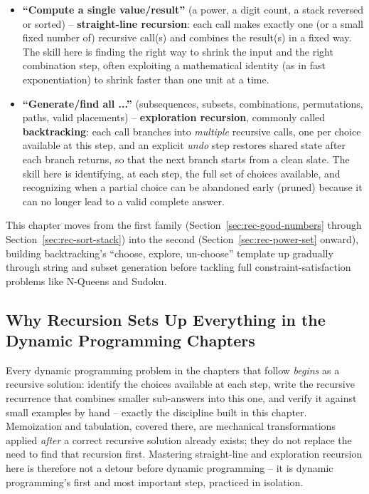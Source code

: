 \begin{patternbox}
\begin{itemize}
  \item \textbf{``Compute a single value/result''} (a power, a digit
        count, a stack reversed or sorted) -- \textbf{straight-line
        recursion}: each call makes exactly one (or a small fixed
        number of) recursive call(s) and combines the result(s) in a
        fixed way. The skill here is finding the right way to shrink the
        input and the right combination step, often exploiting a
        mathematical identity (as in fast exponentiation) to shrink
        faster than one unit at a time.
  \item \textbf{``Generate/find all ...''} (subsequences, subsets,
        combinations, permutations, paths, valid placements) --
        \textbf{exploration recursion}, commonly called
        \textbf{backtracking}: each call branches into \emph{multiple}
        recursive calls, one per choice available at this step, and an
        explicit \emph{undo} step restores shared state after each
        branch returns, so that the next branch starts from a clean
        slate. The skill here is identifying, at each step, the full set
        of choices available, and recognizing when a partial choice can
        be abandoned early (pruned) because it can no longer lead to a
        valid complete answer.
\end{itemize}
This chapter moves from the first family (Section~\ref{sec:rec-good-numbers}
through Section~\ref{sec:rec-sort-stack}) into the second
(Section~\ref{sec:rec-power-set} onward), building backtracking's
``choose, explore, un-choose'' template up gradually through string and
subset generation before tackling full constraint-satisfaction problems
like N-Queens and Sudoku.
\end{patternbox}

\subsection*{Why Recursion Sets Up Everything in the Dynamic Programming Chapters}

Every dynamic programming problem in the chapters that follow
\emph{begins} as a recursive solution: identify the choices available at
each step, write the recursive recurrence that combines smaller
sub-answers into this one, and verify it against small examples by hand
-- exactly the discipline built in this chapter. Memoization and
tabulation, covered there, are mechanical transformations applied
\emph{after} a correct recursive solution already exists; they do not
replace the need to find that recursion first. Mastering straight-line
and exploration recursion here is therefore not a detour before dynamic
programming -- it is dynamic programming's first and most important step,
practiced in isolation.

